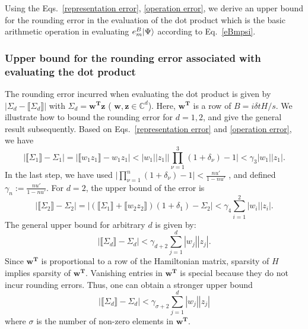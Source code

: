 Using the Eqs.\ \eqref{representation error}, \eqref{operation error}, we derive an upper bound for the rounding error in the evaluation of the dot product which is the basic arithmetic operation in evaluating $e^B_m|\Psi\rangle$ according to Eq.\ \eqref{eBmpsi}.

\subsubsection{Upper bound for the rounding error associated with evaluating the dot product}
The rounding error incurred when evaluating the dot product is given by $|\Sigma_d-\llbracket \Sigma_d\rrbracket|$ with $\Sigma_d=\boldsymbol{w^\text{T}z}$ ( $\boldsymbol{w},\boldsymbol {z} \in\mathbb{C}^{d}$). Here, $\boldsymbol{w^\text{T}}$ is a row of $B=i\delta t H/s$. We illustrate how to bound the rounding error for $d=1,2$, and give the general result subsequently. Based on Eqs.\ \eqref{representation error} and \eqref{operation error}, we have
\begin{equation}
\label{c7}
    |\llbracket \Sigma_1\rrbracket-\Sigma_1|=|\llbracket w_1  z_1\rrbracket-w_1z_1|<|w_1||z_1|\big|\prod_{\nu=1}^3(1+\delta_\nu)-1\big|<\gamma_3 |w_1||z_1|.
\end{equation}
In the last step, we have used $\big|\prod_{\nu=1}^n(1+\delta_\nu)-1\big|<\frac{nu'}{1-nu'}$ \cite{higham2002accuracy}, and defined $\gamma_n:=\frac{nu'}{1-nu'}$. For $d=2$, the upper bound of the error is
\begin{equation}
\label{c8}
     |\llbracket \Sigma_2\rrbracket-\Sigma_2|=|(\llbracket \Sigma_1\rrbracket+\llbracket w_2 z_2\rrbracket )(1+\delta_1)-\Sigma_2|<\gamma_4\sum_{i=1}^2|w_i||z_i|.
\end{equation}
The general upper bound for arbitrary $d$ is given by:
\begin{equation}
    |\llbracket \Sigma_d\rrbracket-\Sigma_d| <\gamma_{d+2}\sum_{j=1}^{d}|w_j|| z_j|.
\end{equation}
Since $\boldsymbol{w^\text{T}}$ is proportional to a row of the Hamiltonian matrix, sparsity of $H$ implies sparsity of $\boldsymbol{w^\text{T}}$. Vanishing entries in $\boldsymbol{w^\text{T}}$ is special because they do not incur rounding errors. Thus, one can obtain a stronger upper bound
\begin{equation}
\label{C10}
    |\llbracket \Sigma_d\rrbracket-\Sigma_d|<\gamma_{\sigma+2}\sum_{j=1}^{d}|w_j|| z_j|
\end{equation}
where $\sigma$ is the number of non-zero elements in $\boldsymbol{w^\text{T}}$.
